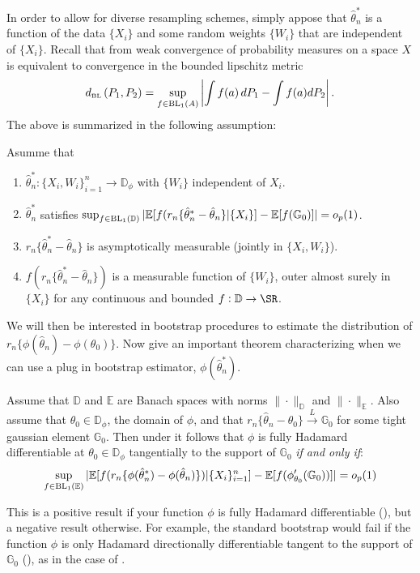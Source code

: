 In order to allow for diverse resampling schemes, simply appose that \(\hat\theta_n^*\) is a function of the data \(\{X_i\}\) and some random weights \(\{W_i\}\) that are independent of \(\{X_i\}\). Recall that from  weak convergence of probability measures on a space \(X\) is equivalent to convergence in the bounded lipschitz metric
\[
	d_{\text{\tiny BL}}\left(P_1,P_2\right) = \sup_{f\in \text{BL}_1(A)} \left|\int f(a)\,dP_1 - \int f(a) dP_2\right|
.\] 
The above is summarized in the following assumption:
\begin{assumption}
	\label{assm:fs-3}
	Asumme that
	\begin{enumerate}
		\item \(\hat\theta^*_n:\{X_i,W_i\}_{i=1}^n \to \mathbb{D}_\phi\) with \(\{W_i\}\) independent of \(X_i\).
		\item \(\hat\theta_n^*\) satisfies \(\sup_{f\in\text{BL}_1(\mathbb{D})}|\mathbb{E}[f(r_n\{\hat\theta^*_n-\hat\theta_n\}|\{X_i\}]-\mathbb{E}[f(\mathbb{G}_0)]|=o_p(1)\).
		\item \(r_n\{\hat\theta_n^*-\hat\theta_n\}\) is asymptotically measurable (jointly in \(\{X_i,W_i\}\)).
		\item \(f(r_n\{\hat\theta_n^*-\hat\theta_n\})\) is a measurable function of \(\{W_i\}\), outer almost surely in \(\{X_i\}\) for any continuous and bounded \(f:\mathbb{D}\to\SR\).
	\end{enumerate}
\end{assumption}
We will then be interested in bootstrap procedures to estimate the distribution of \(r_n\{\phi(\hat\theta_n)-\phi(\theta_0)\}\). Now give an important theorem characterizing when we can use a plug in bootstrap estimator, \(\phi(\hat\theta^*_n)\).
\begin{theorem}
	\label{thm:fs-3.1}
	Assume that \(\mathbb{D}\) and \(\mathbb{E}\) are Banach spaces with norms \(\|\cdot\|_{\mathbb{D}}\) and \(\|\cdot\|_{\mathbb{E}}\). Also assume that \(\theta_0\in \mathbb{D}_{\phi}\), the domain of \(\phi\), and that \(r_n\{\hat\theta_n-\theta_0\}\overset{L}{\to} \mathbb{G}_0\) for some tight gaussian element \(\mathbb{G}_0\). Then under  it follows that \(\phi\) is fully Hadamard differentiable at \(\theta_0\in \mathbb{D}_\phi\) tangentially to the support of \(\mathbb{G}_0\) \emph{if and only if}:
	\begin{equation}
		\label{eq:fs-3.1}
		\sup_{f\in \text{BL}_1(\mathbb{E})} |\mathbb{E}[f(r_n\{\phi(\hat\theta_n^*)-\phi(\hat\theta_n)\})|\{X_i\}_{i=1}^n] - \mathbb{E}[f(\phi_{\theta_0}'(\mathbb{G}_0))]|=o_p(1)
	\end{equation}
\end{theorem}
This is a positive result if your function \(\phi\) is fully Hadamard differentiable (), but a negative result otherwise. For example, the standard bootstrap would fail if the function \(\phi\) is only Hadamard directionally differentiable tangent to the support of \(\mathbb{G}_0\) (), as in the case of . 

